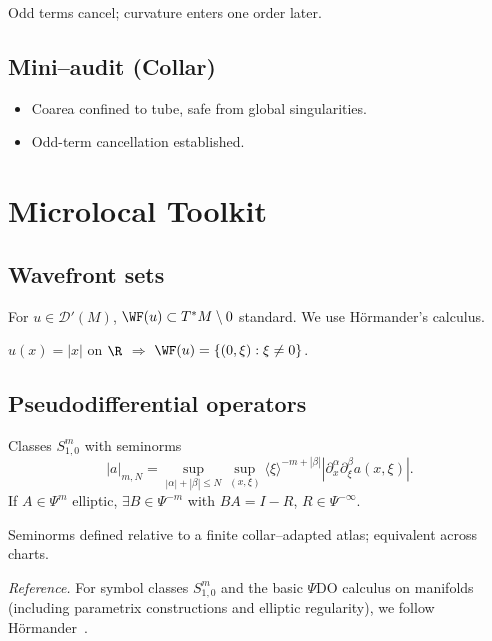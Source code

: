 \begin{remark}
Odd terms cancel; curvature enters one order later.
\end{remark}

\subsection*{Mini–audit (Collar)}
\begin{itemize}
  \item Coarea confined to tube, safe from global singularities.
  \item Odd-term cancellation established.
\end{itemize}

\section{Microlocal Toolkit}
\label{sec:microlocal-core}

\subsection{Wavefront sets}
For $u\in\mathcal D'(M)$, $\WF(u)\subset T^*M\setminus0$ standard. 
We use H\"ormander’s calculus.

\begin{example}
$u(x)=|x|$ on $\R$ $\Rightarrow$ $\WF(u)=\{(0,\xi):\xi\ne0\}$.
\end{example}

\subsection{Pseudodifferential operators}
Classes $S^m_{1,0}$ with seminorms
\[
|a|_{m,N}=\sup_{|\alpha|+|\beta|\le N}\sup_{(x,\xi)} \langle\xi\rangle^{-m+|\beta|}|\partial_x^\alpha \partial_\xi^\beta a(x,\xi)|.
\]
If $A\in\Psi^m$ elliptic, $\exists B\in\Psi^{-m}$ with $BA=I-R$, $R\in\Psi^{-\infty}$.

\begin{remark}
Seminorms defined relative to a finite collar–adapted atlas; equivalent across charts.
\end{remark}

\emph{Reference.} For symbol classes $S^{m}_{1,0}$ and the basic $\Psi$DO calculus on manifolds (including parametrix constructions and elliptic regularity), we follow H\"ormander~\cite[Vol.~I, Ch.~18; Vol.~III, Chs.~17–18]{HormanderI,HormanderIII}.

